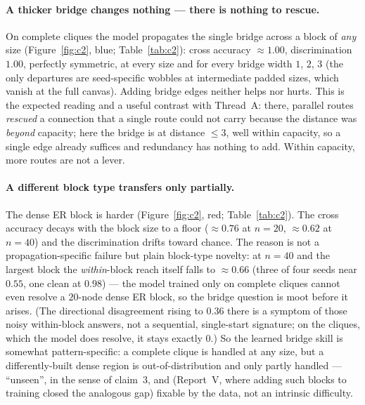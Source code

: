 \documentclass[11pt,a4paper]{article}
\begin{document}
\paragraph{A thicker bridge changes nothing --- there is nothing to rescue.} On complete cliques the
model propagates the single bridge across a block of \emph{any} size (Figure~\ref{fig:c2}, blue;
Table~\ref{tab:c2}): cross accuracy $\approx1.00$, discrimination $1.00$, perfectly symmetric, at every
size and for every bridge width $1$, $2$, $3$ (the only departures are seed-specific wobbles at
intermediate padded sizes, which vanish at the full canvas). Adding bridge edges neither helps nor hurts.
This is the expected reading and a useful contrast with Thread~A: there, parallel routes \emph{rescued} a
connection that a single route could not carry because the distance was \emph{beyond} capacity; here the
bridge is at distance $\le3$, well within capacity, so a single edge already suffices and redundancy has
nothing to add. Within capacity, more routes are not a lever.

\paragraph{A different block type transfers only partially.} The dense ER block is harder
(Figure~\ref{fig:c2}, red; Table~\ref{tab:c2}). The cross accuracy decays with the block size to a floor
($\approx0.76$ at $n=20$, $\approx0.62$ at $n=40$) and the discrimination drifts toward chance. The
reason is not a propagation-specific failure but plain block-type novelty: at $n=40$ and the largest
block the \emph{within}-block reach itself falls to $\approx0.66$ (three of four seeds near $0.55$, one
clean at $0.98$) --- the model trained only on complete cliques cannot even resolve a $20$-node dense ER
block, so the bridge question is moot before it arises. (The directional disagreement rising to $0.36$
there is a symptom of those noisy within-block answers, not a sequential, single-start signature; on the
cliques, which the model does resolve, it stays exactly $0$.) So the learned bridge skill is somewhat
pattern-specific: a complete clique is handled at any size, but a differently-built dense region is
out-of-distribution and only partly handled --- ``unseen'', in the sense of claim~3, and (Report~V, where
adding such blocks to training closed the analogous gap) fixable by the data, not an intrinsic
difficulty.
\end{document}
